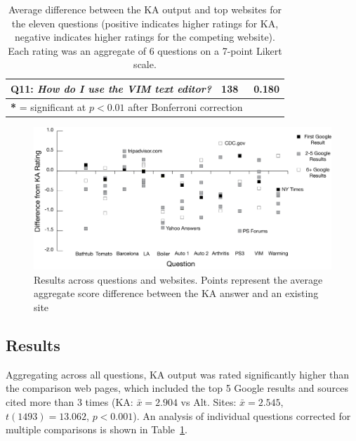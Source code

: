 \begin{table}
\begin{tabular}{l r l}
	\multicolumn{1}{p{0.75\columnwidth}}{\textbf{Q11}: \textit{How do I use the VIM text editor?}}
	& 138 & ~0.180 \\
    \hline
    \multicolumn{3}{l}{\textbf{*} = significant at $p < 0.01$ after Bonferroni correction}\\

  \end{tabular}
  \caption[Comparing KA output with top websites for the eleven questions.]{Average difference between the KA output and top websites for the eleven questions (positive indicates higher ratings for KA, negative indicates higher ratings for the competing website). Each rating was an aggregate of 6 questions on a 7-point Likert scale.}
  \label{tab:evaluation}
\end{table}

\begin{figure}
    \centering
    \includegraphics[width=1\columnwidth]{Chapters/KA/source_eval_graph}
    \caption[Results across questions and websites.]{Results across questions and websites. Points represent the average aggregate score difference between the KA answer and an existing site}
    \label{fig:aggregated}
\end{figure}

\subsection{Results}
Aggregating across all questions, KA output was rated significantly higher than the comparison web pages, which included the top 5 Google results and sources cited more than 3 times (KA: $\bar{x} = 2.904$ vs Alt. Sites: $\bar{x} = 2.545$, $t(1493) = 13.062$, $p < 0.001$). An analysis of individual questions corrected for multiple comparisons is shown in Table~\ref{tab:evaluation}. 

